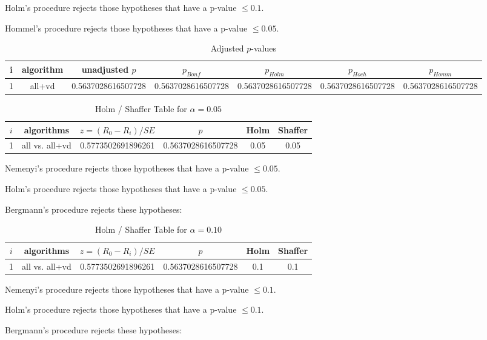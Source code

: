 \documentclass[a4paper,10pt]{article}
\begin{document}
\begin{landscape}
Holm's procedure rejects those hypotheses that have a p-value $\le0.1$.


Hommel's procedure rejects those hypotheses that have a p-value $\le0.05$.


\begin{table}[!htp]
\centering\tiny
\caption{Adjusted $p$-values}
\begin{tabular}{ccccccc}
i&algorithm&unadjusted $p$&$p_{Bonf}$&$p_{Holm}$&$p_{Hoch}$&$p_{Homm}$\\
\hline
1&all+vd&0.5637028616507728&0.5637028616507728&0.5637028616507728&0.5637028616507728&0.5637028616507728\\
\hline
\end{tabular}
\end{table}

\begin{table}[!htp]
\centering\tiny
\caption{Holm / Shaffer Table for $\alpha=0.05$}
\begin{tabular}{cccccc}
$i$&algorithms&$z=(R_0 - R_i)/SE$&$p$&Holm&Shaffer\\
\hline
1&all vs. all+vd&0.5773502691896261&0.5637028616507728&0.05&0.05\\\hline
\end{tabular}
\end{table}
Nemenyi's procedure rejects those hypotheses that have a p-value $\le0.05$.


Holm's procedure rejects those hypotheses that have a p-value $\le0.05$.


Bergmann's procedure rejects these hypotheses:


\begin{itemize}


\end{itemize}


\begin{table}[!htp]
\centering\tiny
\caption{Holm / Shaffer Table for $\alpha=0.10$}
\begin{tabular}{cccccc}
$i$&algorithms&$z=(R_0 - R_i)/SE$&$p$&Holm&Shaffer\\
\hline
1&all vs. all+vd&0.5773502691896261&0.5637028616507728&0.1&0.1\\\hline
\end{tabular}
\end{table}
Nemenyi's procedure rejects those hypotheses that have a p-value $\le0.1$.


Holm's procedure rejects those hypotheses that have a p-value $\le0.1$.


Bergmann's procedure rejects these hypotheses:



\end{landscape}
\end{document}
